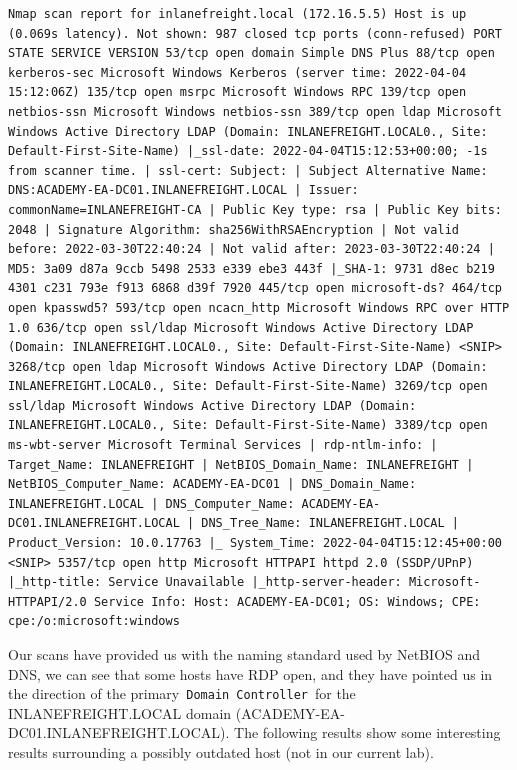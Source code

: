 \begin{verbatim}
Nmap scan report for inlanefreight.local (172.16.5.5) Host is up (0.069s latency). Not shown: 987 closed tcp ports (conn-refused) PORT STATE SERVICE VERSION 53/tcp open domain Simple DNS Plus 88/tcp open kerberos-sec Microsoft Windows Kerberos (server time: 2022-04-04 15:12:06Z) 135/tcp open msrpc Microsoft Windows RPC 139/tcp open netbios-ssn Microsoft Windows netbios-ssn 389/tcp open ldap Microsoft Windows Active Directory LDAP (Domain: INLANEFREIGHT.LOCAL0., Site: Default-First-Site-Name) |_ssl-date: 2022-04-04T15:12:53+00:00; -1s from scanner time. | ssl-cert: Subject: | Subject Alternative Name: DNS:ACADEMY-EA-DC01.INLANEFREIGHT.LOCAL | Issuer: commonName=INLANEFREIGHT-CA | Public Key type: rsa | Public Key bits: 2048 | Signature Algorithm: sha256WithRSAEncryption | Not valid before: 2022-03-30T22:40:24 | Not valid after: 2023-03-30T22:40:24 | MD5: 3a09 d87a 9ccb 5498 2533 e339 ebe3 443f |_SHA-1: 9731 d8ec b219 4301 c231 793e f913 6868 d39f 7920 445/tcp open microsoft-ds? 464/tcp open kpasswd5? 593/tcp open ncacn_http Microsoft Windows RPC over HTTP 1.0 636/tcp open ssl/ldap Microsoft Windows Active Directory LDAP (Domain: INLANEFREIGHT.LOCAL0., Site: Default-First-Site-Name) <SNIP> 3268/tcp open ldap Microsoft Windows Active Directory LDAP (Domain: INLANEFREIGHT.LOCAL0., Site: Default-First-Site-Name) 3269/tcp open ssl/ldap Microsoft Windows Active Directory LDAP (Domain: INLANEFREIGHT.LOCAL0., Site: Default-First-Site-Name) 3389/tcp open ms-wbt-server Microsoft Terminal Services | rdp-ntlm-info: | Target_Name: INLANEFREIGHT | NetBIOS_Domain_Name: INLANEFREIGHT | NetBIOS_Computer_Name: ACADEMY-EA-DC01 | DNS_Domain_Name: INLANEFREIGHT.LOCAL | DNS_Computer_Name: ACADEMY-EA-DC01.INLANEFREIGHT.LOCAL | DNS_Tree_Name: INLANEFREIGHT.LOCAL | Product_Version: 10.0.17763 |_ System_Time: 2022-04-04T15:12:45+00:00 <SNIP> 5357/tcp open http Microsoft HTTPAPI httpd 2.0 (SSDP/UPnP) |_http-title: Service Unavailable |_http-server-header: Microsoft-HTTPAPI/2.0 Service Info: Host: ACADEMY-EA-DC01; OS: Windows; CPE: cpe:/o:microsoft:windows 
\end{verbatim}

Our scans have provided us with the naming standard used by NetBIOS and DNS, we can see that some hosts have RDP open, and they have pointed us in the direction of the primary \verb|Domain Controller| for the INLANEFREIGHT.LOCAL domain (ACADEMY-EA-DC01.INLANEFREIGHT.LOCAL). The following results show some interesting results surrounding a possibly outdated host (not in our current lab).

